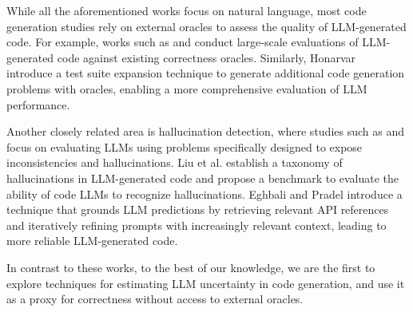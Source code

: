 
While all the aforementioned works focus on natural language, most code generation studies rely on external oracles to assess the quality of LLM-generated code.
For example, works such as \cite{liu2024your} and \cite{vaithilingam2022expectation} conduct large-scale evaluations of LLM-generated code against existing correctness oracles. Similarly, Honarvar~\etal~\cite{honarvar2024turbulencesystematicallyautomaticallytesting} introduce a test suite expansion technique to generate additional code generation problems with oracles, enabling a more comprehensive evaluation of LLM performance.

Another closely related area is hallucination detection, where studies such as \cite{liu2024exploring} and \cite{eghbali2024hallucinator} focus on evaluating LLMs using problems specifically designed to expose inconsistencies and hallucinations.
Liu et al.\cite{liu2024exploring} establish a taxonomy of hallucinations in LLM-generated code and propose a benchmark to evaluate the ability of code LLMs to recognize hallucinations. Eghbali and Pradel\cite{eghbali2024hallucinator} introduce a technique that grounds LLM predictions by retrieving relevant API references and iteratively refining prompts with increasingly relevant context, leading to more reliable LLM-generated code.

In contrast to these works, to the best of our knowledge, we are the first to explore techniques for estimating LLM uncertainty in code generation, and use it as a proxy for correctness without access to external oracles.

